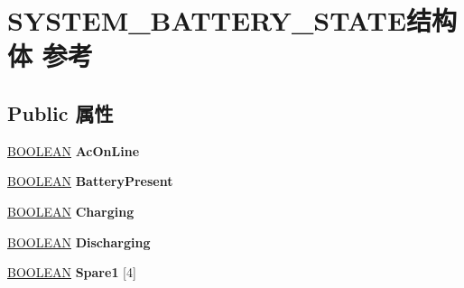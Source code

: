 \hypertarget{struct_s_y_s_t_e_m___b_a_t_t_e_r_y___s_t_a_t_e}{}\section{S\+Y\+S\+T\+E\+M\+\_\+\+B\+A\+T\+T\+E\+R\+Y\+\_\+\+S\+T\+A\+T\+E结构体 参考}
\label{struct_s_y_s_t_e_m___b_a_t_t_e_r_y___s_t_a_t_e}
\subsection*{Public 属性}
\begin{DoxyCompactItemize}
\item 
\mbox{\label{struct_s_y_s_t_e_m___b_a_t_t_e_r_y___s_t_a_t_e_a628e1686defc36451a5197a4d1a10ad9}} 
\hyperlink{_processor_bind_8h_a112e3146cb38b6ee95e64d85842e380a}{B\+O\+O\+L\+E\+AN} {\bfseries Ac\+On\+Line}
\item 
\mbox{\label{struct_s_y_s_t_e_m___b_a_t_t_e_r_y___s_t_a_t_e_a799b7bcb21abedf0896f187f7691e63e}} 
\hyperlink{_processor_bind_8h_a112e3146cb38b6ee95e64d85842e380a}{B\+O\+O\+L\+E\+AN} {\bfseries Battery\+Present}
\item 
\mbox{\label{struct_s_y_s_t_e_m___b_a_t_t_e_r_y___s_t_a_t_e_a01a680d7423171cfce8800fc5276dc04}} 
\hyperlink{_processor_bind_8h_a112e3146cb38b6ee95e64d85842e380a}{B\+O\+O\+L\+E\+AN} {\bfseries Charging}
\item 
\mbox{\label{struct_s_y_s_t_e_m___b_a_t_t_e_r_y___s_t_a_t_e_a641ba17c0032c8e0d85d27082c4aa523}} 
\hyperlink{_processor_bind_8h_a112e3146cb38b6ee95e64d85842e380a}{B\+O\+O\+L\+E\+AN} {\bfseries Discharging}
\item 
\mbox{\label{struct_s_y_s_t_e_m___b_a_t_t_e_r_y___s_t_a_t_e_a5e5a76444364b3847ab457fe0867dee7}} 
\hyperlink{_processor_bind_8h_a112e3146cb38b6ee95e64d85842e380a}{B\+O\+O\+L\+E\+AN} {\bfseries Spare1} \mbox{[}4\mbox{]}
\item 
\mbox{\label{struct_s_y_s_t_e_m___b_a_t_t_e_r_y___s_t_a_t_e_a353d2087bb1390cea7258fdc37bd4abf}} 

\end{DoxyCompactItemize}
